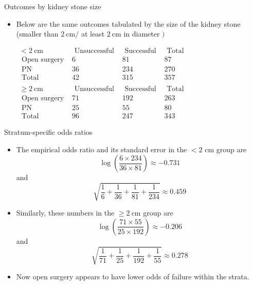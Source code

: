 \documentclass[10pt]{beamer}\usepackage[]{graphicx}\usepackage[]{color}
\begin{document}
\begin{frame}{Outcomes by kidney stone size}
	\begin{itemize}
		\item Below are the same outcomes tabulated by the size of the kidney stone (smaller than $2 \mathrm{~cm} /$ at least $2 \mathrm{~cm}$ in diameter $)$
		
		\vspace{0.2in}
		
		
$\begin{array}{lccc}
	<2 \mathrm{~cm} & \text { Unsuccessful } & \text { Successful } & \text { Total } \\
	\text { Open surgery } & 6 & 81 & 87 \\
	\text { PN } & 36 & 234 & 270 \\
	\text { Total } & 42 & 315 & 357 \\
	& & & \\
	\geq 2 \mathrm{~cm} & \text { Unsuccessful } & \text { Successful } & \text { Total } \\
	\text { Open surgery } & 71 & 192 & 263 \\
	\text { PN } & 25 & 55 & 80 \\
	\text { Total } & 96 & 247 & 343
\end{array}$
	\end{itemize}
\end{frame}


\begin{frame}{Stratum-specific odds ratios}
	\begin{itemize}
		\item The empirical odds ratio and its standard error in the $<2$
		cm group are
		$$
		\log \left(\frac{6 \times 234}{36 \times 81}\right) \approx-0.731
		$$
		and
		$$
		\sqrt{\frac{1}{6}+\frac{1}{36}+\frac{1}{81}+\frac{1}{234}} \approx 0.459
		$$
		\item Similarly, these numbers in the $\geq 2 \mathrm{~cm}$ group are
		$$
		\log \left(\frac{71 \times 55}{25 \times 192}\right) \approx-0.206
		$$
		and
		$$
		\sqrt{\frac{1}{71}+\frac{1}{25}+\frac{1}{192}+\frac{1}{55}} \approx 0.278
		$$
		\item Now open surgery appears to have lower odds of failure within the strata.
	\end{itemize}
	
\end{frame}
\end{document}
